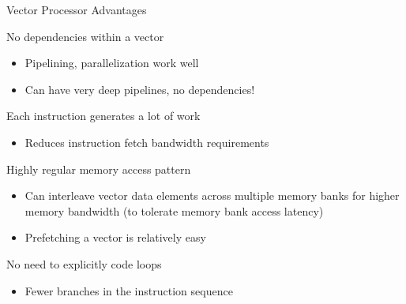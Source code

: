 \documentclass[presentation]{beamer}
\begin{document}
\begin{frame}[label={sec:org30da707}]{Vector Processor Advantages}
\begin{block}{\alert{No dependencies} within a vector}
\begin{itemize}
\item Pipelining, parallelization work well
\item Can have very deep pipelines, no dependencies!
\end{itemize}
\end{block}

\begin{block}{Each instruction generates a lot of work}
\begin{itemize}
\item \alert{Reduces instruction fetch} bandwidth requirements
\end{itemize}
\end{block}

\begin{block}{Highly \alert{regular memory access pattern}}
\begin{itemize}
\item Can interleave vector data elements across multiple memory banks for higher memory bandwidth (to tolerate memory bank access latency)
\item Prefetching a vector is relatively easy
\end{itemize}
\end{block}

\begin{block}{No need to explicitly code loops}
\begin{itemize}
\item \alert{Fewer branches} in the instruction sequence
\end{itemize}
\end{block}
\end{frame}
\end{document}
